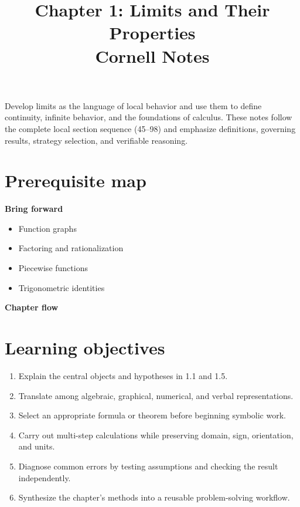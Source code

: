 \documentclass[11pt]{article}
\title{Chapter 1: Limits and Their Properties\\[2mm]\large Cornell Notes}
\author{}
\date{}
\begin{document}
\maketitle
\thispagestyle{fancy}
\begin{orientationbox}
Develop limits as the language of local behavior and use them to define continuity, infinite behavior, and the foundations of calculus. These notes follow the complete local section sequence (45--98) and emphasize definitions, governing results, strategy selection, and verifiable reasoning.
\end{orientationbox}

\section{Prerequisite map}
\begin{minipage}[t]{0.42\textwidth}
\textbf{Bring forward}
\begin{itemize}
\item Function graphs
\item Factoring and rationalization
\item Piecewise functions
\item Trigonometric identities
\end{itemize}
\end{minipage}\hfill
\begin{minipage}[t]{0.54\textwidth}
\textbf{Chapter flow}
\begin{center}
\end{center}
\end{minipage}

\section{Learning objectives}
\begin{enumerate}
\item Explain the central objects and hypotheses in 1.1 and 1.5.
\item Translate among algebraic, graphical, numerical, and verbal representations.
\item Select an appropriate formula or theorem before beginning symbolic work.
\item Carry out multi-step calculations while preserving domain, sign, orientation, and units.
\item Diagnose common errors by testing assumptions and checking the result independently.
\item Synthesize the chapter's methods into a reusable problem-solving workflow.
\end{enumerate}
\end{document}
